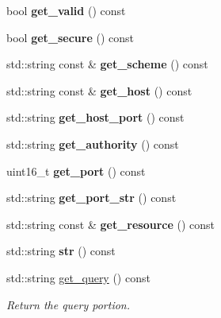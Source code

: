 \begin{DoxyCompactItemize}
\item 
bool {\bfseries get\+\_\+valid} () const\hypertarget{classwebsocketpp_1_1uri_a4a3490cc37fe77c74dcc1e2023a94ee8}{}\label{classwebsocketpp_1_1uri_a4a3490cc37fe77c74dcc1e2023a94ee8}

\item 
bool {\bfseries get\+\_\+secure} () const\hypertarget{classwebsocketpp_1_1uri_ac1580a9bc41d2f0258359be018f74e05}{}\label{classwebsocketpp_1_1uri_ac1580a9bc41d2f0258359be018f74e05}

\item 
std\+::string const  \& {\bfseries get\+\_\+scheme} () const\hypertarget{classwebsocketpp_1_1uri_a5c429f5ef801b5ac43597e4fd56fb1e5}{}\label{classwebsocketpp_1_1uri_a5c429f5ef801b5ac43597e4fd56fb1e5}

\item 
std\+::string const  \& {\bfseries get\+\_\+host} () const\hypertarget{classwebsocketpp_1_1uri_a43ca106f594a4e2a0664c044b56e6463}{}\label{classwebsocketpp_1_1uri_a43ca106f594a4e2a0664c044b56e6463}

\item 
std\+::string {\bfseries get\+\_\+host\+\_\+port} () const\hypertarget{classwebsocketpp_1_1uri_adf24841d8eef4d7cd8e9687ce23dc5d4}{}\label{classwebsocketpp_1_1uri_adf24841d8eef4d7cd8e9687ce23dc5d4}

\item 
std\+::string {\bfseries get\+\_\+authority} () const\hypertarget{classwebsocketpp_1_1uri_a6d6a43a1f16f50b67316f0ddb5ba638a}{}\label{classwebsocketpp_1_1uri_a6d6a43a1f16f50b67316f0ddb5ba638a}

\item 
uint16\+\_\+t {\bfseries get\+\_\+port} () const\hypertarget{classwebsocketpp_1_1uri_a0e076cf37744e52bfc559eaeacba6714}{}\label{classwebsocketpp_1_1uri_a0e076cf37744e52bfc559eaeacba6714}

\item 
std\+::string {\bfseries get\+\_\+port\+\_\+str} () const\hypertarget{classwebsocketpp_1_1uri_acd48cd7f186231327bfd9fcfe5f4864f}{}\label{classwebsocketpp_1_1uri_acd48cd7f186231327bfd9fcfe5f4864f}

\item 
std\+::string const  \& {\bfseries get\+\_\+resource} () const\hypertarget{classwebsocketpp_1_1uri_a58c7782306726d866a1cb8b02e2a5d08}{}\label{classwebsocketpp_1_1uri_a58c7782306726d866a1cb8b02e2a5d08}

\item 
std\+::string {\bfseries str} () const\hypertarget{classwebsocketpp_1_1uri_ad684773687e2b92f2c0d0c9bcad48a17}{}\label{classwebsocketpp_1_1uri_ad684773687e2b92f2c0d0c9bcad48a17}

\item 
std\+::string \hyperlink{classwebsocketpp_1_1uri_a74950872d4c2a4c18df2ec5c9fca1877}{get\+\_\+query} () const
\begin{DoxyCompactList}\small\item\em Return the query portion. \end{DoxyCompactList}\end{DoxyCompactItemize}


